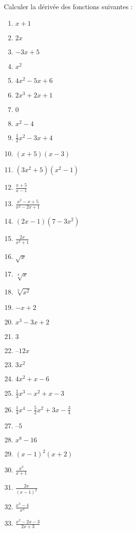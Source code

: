 \begin{exercice}
Calculer la dérivée des fonctions suivantes :
\begin{multicols}{3}
\begin{enumerate} 
\item $x+1$
\item $2x$
\item $-3x+5$
\item ${{x}^{2}}$
\item $4{{x}^{2}}-5x+6$
\item $2{{x}^{3}}+2x+1$
\item $0$
\item ${{x}^{2}}-4$
\item $\frac{1}{2}{{x}^{2}}-3x+4$
\item $\left( x+5 \right)\left( x-3 \right)$
\item $\left( 3{{x}^{2}}+5 \right)\left( {{x}^{2}}-1 \right)$
\item $\frac{x+5}{x-1}$
\item $\frac{{{x}^{2}}-x+5}{{{x}^{2}}-2x+1}$
\item $\left( 2x-1 \right)\left( 7-3{{x}^{2}} \right)$
\item $\frac{2x}{{{x}^{2}}+1}$
\item $\sqrt{x}$
\item $\sqrt[3]{x}$
\item $\sqrt[3]{{{x}^{2}}}$
\item $-x+2$
\item ${{x}^{3}}-3x+2$
\item $3$
\item $–12x$
\item $3{{x}^{2}}$
\item $4{{x}^{2}}+x-6$
\item $\frac{1}{3}{{x}^{3}}-{{x}^{2}}+x-3$
\item $\frac{1}{4}{{x}^{4}}-\frac{5}{2}{{x}^{2}}+3x-\frac{3}{4}$
\item $–5$
\item ${{x}^{8}}-16$
\item ${{\left( x-1 \right)}^{2}}\left( x+2 \right)$
\item $\frac{{{x}^{3}}}{x+1}$
\item $\frac{2x}{{{\left( x-1 \right)}^{2}}}$
\item $\frac{{{x}^{3}}-4}{{{x}^{2}}}$
\item $\frac{{{x}^{2}}-2x-3}{2x+3}$
\end{enumerate}
\end{multicols}
\end{exercice} 

